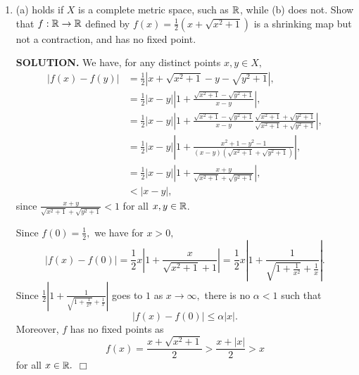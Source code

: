 \documentclass{article}
\begin{document}
\begin{enumerate}
\begin{enumerate}
        \item (a) holds if $X$ is a complete metric space, such as $\mathbb{R}$, while (b) does not. Show that $f: \mathbb{R} \rightarrow \mathbb{R}$ defined by $f(x) = \frac12 \left(x + \sqrt{x^2+1}\right)$ is a shrinking map but not a contraction, and has no fixed point.

        {\bf SOLUTION.} We have, for any distinct points $x, y \in X,$
        \begin{align*}
            |f(x)-f(y)| &= \frac12 \left| x + \sqrt{x^2+1} - y - \sqrt{y^2+1} \right|, \\
            &= \frac12 |x-y|\left| 1 + \frac{\sqrt{x^2+1} - \sqrt{y^2+1}}{x-y} \right|, \\
            &= \frac12 |x-y|\left| 1 + \frac{\sqrt{x^2+1} - \sqrt{y^2+1}}{x-y}\frac{\sqrt{x^2+1} + \sqrt{y^2+1}}{\sqrt{x^2+1} + \sqrt{y^2+1}} \right|, \\
            &= \frac12 |x-y|\left| 1 + \frac{x^2+1 - y^2-1}{(x-y)(\sqrt{x^2+1} + \sqrt{y^2+1})}\right|, \\
            &= \frac12 |x-y|\left| 1 + \frac{x+y}{\sqrt{x^2+1} + \sqrt{y^2+1}}\right|, \\
            &< |x-y|,
        \end{align*}
        since $\frac{x+y}{\sqrt{x^2+1} + \sqrt{y^2+1}}<1$ for all $x, y \in \mathbb{R}$.
        
        Since $f(0) = \frac12,$ we have for $x > 0,$
        $$|f(x)-f(0)| = \frac12 x\left| 1 + \frac{x}{\sqrt{x^2+1} + 1}\right| = \frac12 x\left| 1 + \frac{1}{\sqrt{1+\frac{1}{x^2}} + \frac{1}{x}}\right|.$$
        Since $\frac12 \left| 1 + \frac{1}{\sqrt{1+\frac{1}{x^2}} + \frac{1}{x}}\right|$ goes to $1$ as $x \rightarrow \infty,$ there is no $\alpha < 1$ such that
        $$|f(x)-f(0)| \leq \alpha |x|.$$
        Moreover, $f$ has no fixed points as
        $$f(x) = \frac{x+\sqrt{x^2+1}}{2} > \frac{x+|x|}{2} > x$$
        for all $x \in \mathbb{R}.$ $\Box$
    \end{enumerate}
\end{enumerate}
\end{document}
